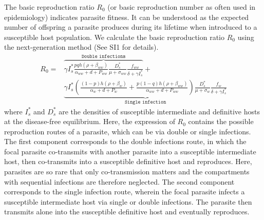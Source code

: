 \documentclass[a4paper]{scrartcl}
\begin{document}
The basic reproduction ratio $R_0$ (or basic reproduction number as often used in epidemiology) indicates parasite fitness. 
It can be understood as the expected number of offspring a parasite produces during its lifetime when introduced to a susceptible host population. 
We calculate the basic reproduction ratio $R_0$ using the next-generation method \citep{Diekmann1990, Diekmann2009, hurford:JRSI:2010} (See SI1 for details).
%
\begin{align}
R_0 = & \overbrace{\gamma I_s^* \frac{p q h (\rho +  \beta_{ww})}{\alpha_{ww} + d + P_{ww}} \frac{D_s^*}{\mu +\sigma_{ww}} \frac{f_{ww}}{\delta +\gamma I_s^*}}^{ \texttt{Double infections}} + \nonumber \\
& \underbrace{\gamma  I_s^* \left( \frac{ (1-p) h (\rho + \beta_w)}{\alpha_w + d + P_w} + \frac{p (1-q) h (\rho + \beta_{ww})}{\alpha_{ww} + d + P_{ww}} \right) \frac{D_s^*}{\mu + \sigma_w} \frac{f_w}{\delta +\gamma  I_s^*}}_{\texttt{Single infection}}
\end{align}
%
where $I_s^*$ and $D_s^*$ are the densities of susceptible intermediate and definitive hosts at the disease-free equilibrium. 
Here, the expression of $R_0$ contains the possible reproduction routes of a parasite, which can be via double or single infections. 
The first component corresponds to the double infections route, in which the focal parasite co-transmits with another parasite into a susceptible intermediate host, then co-transmits into a susceptible definitive host and reproduces. 
Here, parasites are so rare that only co-transmission matters and the compartments with sequential infections are therefore neglected. 
The second component corresponds to the single infection route, wherein the focal parasite infects a susceptible intermediate host via single or double infections. 
The parasite then transmits alone into the susceptible definitive host and eventually reproduces. 
\end{document}
